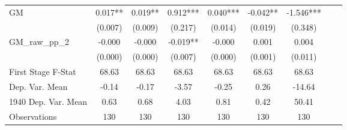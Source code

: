 \begin{tabular}{l*{8}{c}}
GM              &    0.017** &    0.019** &    0.912***&    0.040***&   -0.042** &   -1.546***\\
                &  (0.007)   &  (0.009)   &  (0.217)   &  (0.014)   &  (0.019)   &  (0.348)   \\
\addlinespace
GM\_raw\_pp\_2     &   -0.000   &   -0.000   &   -0.019** &   -0.000   &    0.001   &    0.004   \\
                &  (0.000)   &  (0.000)   &  (0.007)   &  (0.000)   &  (0.001)   &  (0.011)   \\
\midrule
First Stage F-Stat&    68.63   &    68.63   &    68.63   &    68.63   &    68.63   &    68.63   \\
Dep. Var. Mean  &    -0.14   &    -0.17   &    -3.57   &    -0.25   &     0.26   &   -14.64   \\
1940 Dep. Var. Mean&     0.63   &     0.68   &     4.03   &     0.81   &     0.42   &    50.41   \\
Observations    &      130   &      130   &      130   &      130   &      130   &      130   \\
       \bottomrule \end{tabular}
